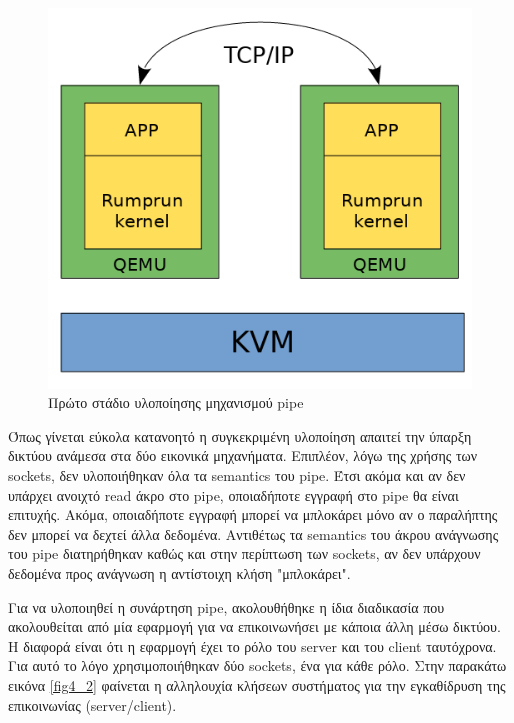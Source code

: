 \begin{figure}[htp]
\centering
\includegraphics[scale=0.7]{figures/pipe_stage1_function.png}
\caption{Πρώτο στάδιο υλοποίησης μηχανισμού pipe\label{fig4_1}}
\end{figure}

Όπως γίνεται εύκολα κατανοητό η συγκεκριμένη υλοποίηση απαιτεί την ύπαρξη
δικτύου ανάμεσα στα δύο εικονικά μηχανήματα. Επιπλέον, λόγω της χρήσης των
sockets, δεν υλοποιήθηκαν όλα τα semantics του pipe. Έτσι ακόμα και αν δεν
υπάρχει ανοιχτό read άκρο στο pipe, οποιαδήποτε εγγραφή στο pipe θα είναι
επιτυχής. Ακόμα, οποιαδήποτε εγγραφή μπορεί να μπλοκάρει μόνο αν ο παραλήπτης
δεν μπορεί να δεχτεί άλλα δεδομένα. Αντιθέτως τα semantics του άκρου ανάγνωσης
του pipe διατηρήθηκαν καθώς και στην περίπτωση των sockets, αν δεν υπάρχουν
δεδομένα προς ανάγνωση η αντίστοιχη κλήση "μπλοκάρει". 

Για να υλοποιηθεί η συνάρτηση pipe, ακολουθήθηκε η ίδια διαδικασία που
ακολουθείται από μία εφαρμογή για να επικοινωνήσει με κάποια άλλη μέσω δικτύου.
Η διαφορά είναι ότι η εφαρμογή έχει το ρόλο του server και του client
ταυτόχρονα. Για αυτό το λόγο χρησιμοποιήθηκαν δύο sockets, ένα για κάθε ρόλο. 
Στην παρακάτω εικόνα \ref{fig4_2} φαίνεται η αλληλουχία κλήσεων συστήματος για
την εγκαθίδρυση της επικοινωνίας (server/client). 

